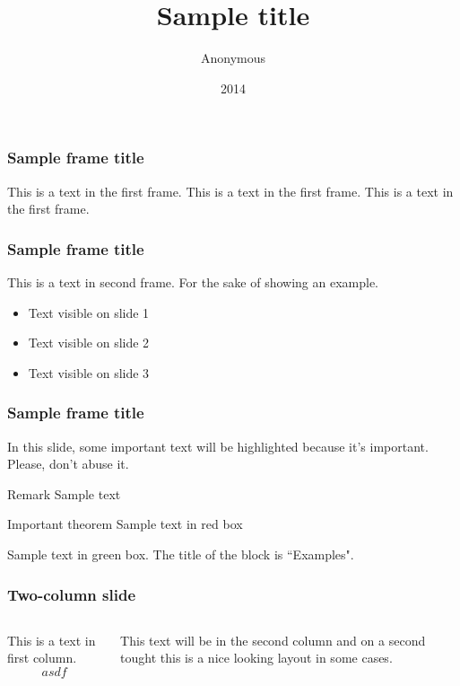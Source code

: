 \documentclass{beamer}
\title{Sample title}
\author{Anonymous}
\institute{Overleaf}
\date{2014}
\begin{document}
 
\frame{\titlepage}
 
\begin{frame}
\frametitle{Sample frame title}
This is a text in the first frame. This is a text in the first frame. This is a text in the first frame.
\end{frame}
 
 
 
 
 
 \begin{frame}
 \frametitle{Sample frame title}
 This is a text in second frame. 
 For the sake of showing an example.
 
 \begin{itemize}
 	\item<1-> Text visible on slide 1
 	\item<2-> Text visible on slide 2
 	\item<3-> Text visible on slide 3
 \end{itemize}
 
\end{frame}





\begin{frame}
\frametitle{Sample frame title}

In this slide, some important text will be
\alert{highlighted} because it's important.
Please, don't abuse it.

\begin{block}{Remark}
	Sample text
\end{block}

\begin{alertblock}{Important theorem}
	Sample text in red box
\end{alertblock}

\begin{examples}
	Sample text in green box. The title of the block is ``Examples".
\end{examples}
\end{frame}

\begin{frame}
\frametitle{Two-column slide}
\begin{columns}
	
	This is a text in first column.
	$$asdf$$
	
	This text will be in the second column
	and on a second tought this is a nice looking
	layout in some cases.
\end{columns}
\end{frame}








 
\end{document}
